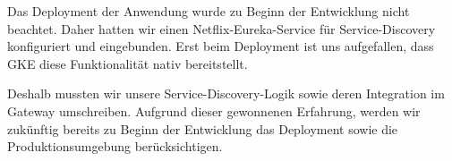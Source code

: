 Das Deployment der Anwendung wurde zu Beginn der Entwicklung nicht beachtet.
Daher hatten wir einen Netflix-Eureka-Service für Service-Discovery konfiguriert und eingebunden.
Erst beim Deployment ist uns aufgefallen, dass GKE diese Funktionalität nativ bereitstellt.

Deshalb mussten wir unsere Service-Discovery-Logik sowie deren Integration im Gateway umschreiben.
Aufgrund dieser gewonnenen Erfahrung, werden wir zukünftig bereits zu Beginn der Entwicklung das Deployment sowie die Produktionsumgebung berücksichtigen. 

